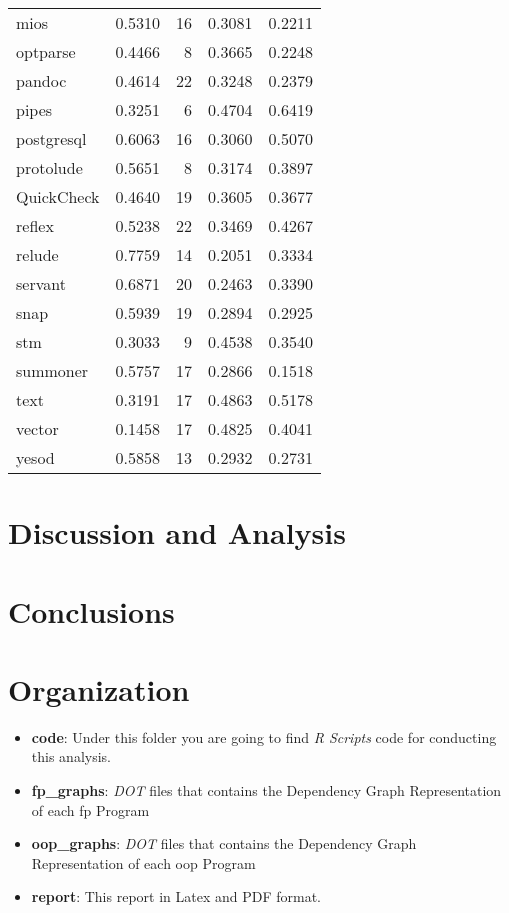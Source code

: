 \documentclass[12pt, a4paper]{article}
\begin{document}
\begin{longtable}[H]{l r r r r}
        mios       &  0.5310  &  16  &  0.3081 &  0.2211 \\      
        optparse   &  0.4466  &   8  &  0.3665 &  0.2248 \\      
        pandoc     &  0.4614  &  22  &  0.3248 &  0.2379 \\      
        pipes      &  0.3251  &   6  &  0.4704 &  0.6419 \\      
        postgresql &  0.6063  &  16  &  0.3060 &  0.5070 \\      
        protolude  &  0.5651  &   8  &  0.3174 &  0.3897 \\      
        QuickCheck &  0.4640  &  19  &  0.3605 &  0.3677 \\      
        reflex     &  0.5238  &  22  &  0.3469 &  0.4267 \\      
        relude     &  0.7759  &  14  &  0.2051 &  0.3334 \\      
        servant    &  0.6871  &  20  &  0.2463 &  0.3390 \\      
        snap       &  0.5939  &  19  &  0.2894 &  0.2925 \\      
        stm        &  0.3033  &   9  &  0.4538 &  0.3540 \\      
        summoner   &  0.5757  &  17  &  0.2866 &  0.1518 \\      
        text       &  0.3191  &  17  &  0.4863 &  0.5178 \\      
        vector     &  0.1458  &  17  &  0.4825 &  0.4041 \\      
        yesod      &  0.5858  &  13  &  0.2932 &  0.2731     

\end{longtable}


\section{Discussion and Analysis}
\section{Conclusions}




\appendix
\section{Organization}\label{apx:sec:org:1}

\begin{itemize}
    \item \textbf{code}: Under this folder you are going to find \textit{R Scripts} code for conducting this analysis.
    \item \textbf{fp\_graphs}: \textit{DOT} files that contains the Dependency Graph Representation of each \acrlong{fp} Program
    \item \textbf{oop\_graphs}: \textit{DOT} files that contains the Dependency Graph Representation of each \acrlong{oop} Program
    \item \textbf{report}: This report in Latex and PDF format.
\end{itemize}
\end{document}
